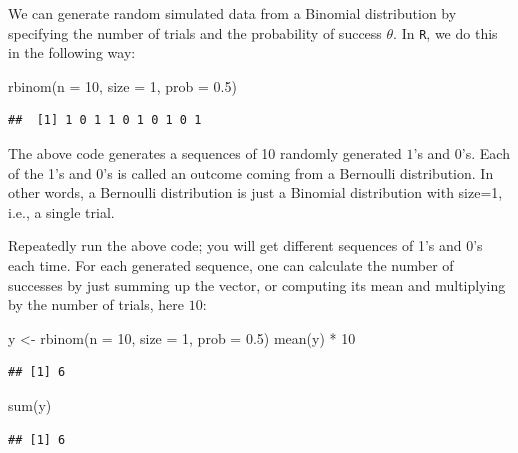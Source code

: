 \documentclass[
  12pt,
]{krantz}
\newenvironment{Shaded}{\begin{snugshade}}{\end{snugshade}}
\newcommand{\AttributeTok}[1]{\textcolor[rgb]{0.77,0.63,0.00}{#1}}
\newcommand{\DecValTok}[1]{\textcolor[rgb]{0.00,0.00,0.81}{#1}}
\newcommand{\FloatTok}[1]{\textcolor[rgb]{0.00,0.00,0.81}{#1}}
\newcommand{\FunctionTok}[1]{\textcolor[rgb]{0.00,0.00,0.00}{#1}}
\newcommand{\NormalTok}[1]{#1}
\newcommand{\OtherTok}[1]{\textcolor[rgb]{0.56,0.35,0.01}{#1}}
\newcommand{\SpecialCharTok}[1]{\textcolor[rgb]{0.00,0.00,0.00}{#1}}
\theoremstyle{definition}
\theoremstyle{definition}
\theoremstyle{definition}
\theoremstyle{definition}
\theoremstyle{remark}
\begin{document}
We can generate random simulated data from a Binomial distribution by specifying the number of trials and the probability of success \(\theta\). In \texttt{R}, we do this in the following way:

\begin{Shaded}
\begin{Highlighting}[]
\FunctionTok{rbinom}\NormalTok{(}\AttributeTok{n =} \DecValTok{10}\NormalTok{, }\AttributeTok{size =} \DecValTok{1}\NormalTok{, }\AttributeTok{prob =} \FloatTok{0.5}\NormalTok{)}
\end{Highlighting}
\end{Shaded}

\begin{verbatim}
##  [1] 1 0 1 1 0 1 0 1 0 1
\end{verbatim}

The above code generates a sequences of 10 randomly generated \(1\)'s and \(0\)'s. Each of the 1's and 0's is called an outcome coming from a Bernoulli distribution. In other words, a Bernoulli distribution is just a Binomial distribution with size=1, i.e., a single trial.

Repeatedly run the above code; you will get different sequences of 1's and 0's each time. For each generated sequence, one can calculate the number of successes by just summing up the vector, or computing its mean and multiplying by the number of trials, here \(10\):

\begin{Shaded}
\begin{Highlighting}[]
\NormalTok{y }\OtherTok{\textless{}{-}} \FunctionTok{rbinom}\NormalTok{(}\AttributeTok{n =} \DecValTok{10}\NormalTok{, }\AttributeTok{size =} \DecValTok{1}\NormalTok{, }\AttributeTok{prob =} \FloatTok{0.5}\NormalTok{)}
\FunctionTok{mean}\NormalTok{(y) }\SpecialCharTok{*} \DecValTok{10}
\end{Highlighting}
\end{Shaded}

\begin{verbatim}
## [1] 6
\end{verbatim}

\begin{Shaded}
\begin{Highlighting}[]
\FunctionTok{sum}\NormalTok{(y)}
\end{Highlighting}
\end{Shaded}

\begin{verbatim}
## [1] 6
\end{verbatim}
\end{document}
